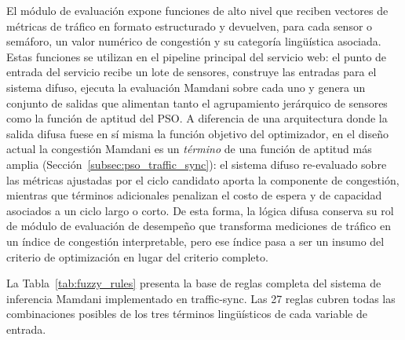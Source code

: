 El módulo de evaluación expone funciones de alto nivel que reciben vectores de métricas de tráfico en formato estructurado y devuelven, para cada sensor o semáforo, un valor numérico de congestión y su categoría lingüística asociada. Estas funciones se utilizan en el pipeline principal del servicio web: el punto de entrada del servicio recibe un lote de sensores, construye las entradas para el sistema difuso, ejecuta la evaluación Mamdani sobre cada uno y genera un conjunto de salidas que alimentan tanto el agrupamiento jerárquico de sensores como la función de aptitud del PSO. A diferencia de una arquitectura donde la salida difusa fuese en sí misma la función objetivo del optimizador, en el diseño actual la congestión Mamdani es un \emph{término} de una función de aptitud más amplia (Sección~\ref{subsec:pso_traffic_sync}): el sistema difuso re-evaluado sobre las métricas ajustadas por el ciclo candidato aporta la componente de congestión, mientras que términos adicionales penalizan el costo de espera y de capacidad asociados a un ciclo largo o corto. De esta forma, la lógica difusa conserva su rol de módulo de evaluación de desempeño que transforma mediciones de tráfico en un índice de congestión interpretable, pero ese índice pasa a ser un insumo del criterio de optimización en lugar del criterio completo.

La Tabla~\ref{tab:fuzzy_rules} presenta la base de reglas completa del sistema de inferencia
Mamdani implementado en traffic-sync. Las 27 reglas cubren todas las combinaciones
posibles de los tres términos lingüísticos de cada variable de entrada.

